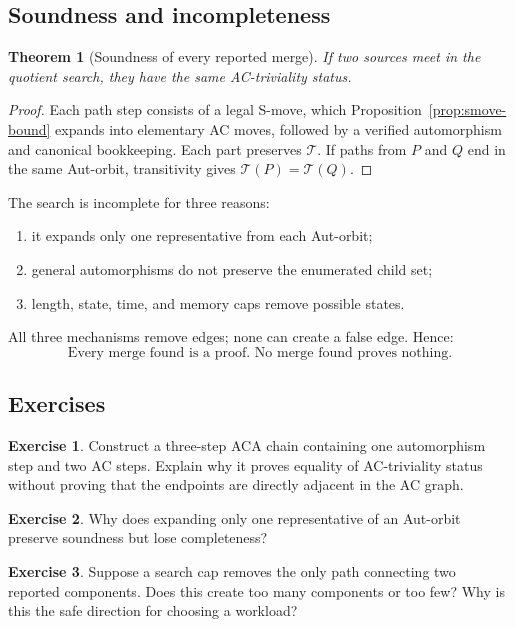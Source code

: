 \documentclass[11pt]{article}
\newtheorem{theorem}{Theorem}[section]
\theoremstyle{definition}
\newtheorem{exercise}{Exercise}[section]
\theoremstyle{remark}
\begin{document}
\subsection{Soundness and incompleteness}

\begin{theorem}[Soundness of every reported merge]
\label{thm:search-sound}
If two sources meet in the quotient search, they have the same
AC-triviality status.
\end{theorem}

\begin{proof}
Each path step consists of a legal S-move, which
Proposition~\ref{prop:smove-bound} expands into elementary AC moves,
followed by a verified automorphism and canonical bookkeeping.  Each part
preserves \(\mathcal T\).  If paths from \(P\) and \(Q\) end in the same
Aut-orbit, transitivity gives \(\mathcal T(P)=\mathcal T(Q)\).
\end{proof}

The search is incomplete for three reasons:
\begin{enumerate}
  \item it expands only one representative from each Aut-orbit;
\item general automorphisms do not preserve the enumerated child set;
\item length, state, time, and memory caps remove possible states.
\end{enumerate}
All three mechanisms remove edges; none can create a false edge.  Hence:
\[
\boxed{\text{Every merge found is a proof.  No merge found proves nothing.}}
\]

\subsection*{Exercises}

\begin{exercise}
Construct a three-step ACA chain containing one automorphism step and two
AC steps.  Explain why it proves equality of AC-triviality status without
proving that the endpoints are directly adjacent in the AC graph.
\end{exercise}

\begin{exercise}
Why does expanding only one representative of an Aut-orbit preserve
soundness but lose completeness?
\end{exercise}

\begin{exercise}
Suppose a search cap removes the only path connecting two reported
components.  Does this create too many components or too few?  Why is this
the safe direction for choosing a workload?
\end{exercise}
\end{document}
